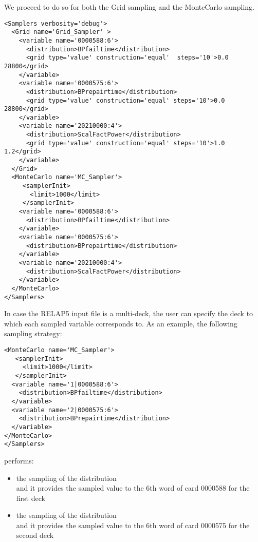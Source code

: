We proceed to do so for both the Grid sampling and the MonteCarlo sampling.

\begin{lstlisting}[style=XML,morekeywords={name,type,construction,lowerBound,steps,limit,initialSeed}]
<Samplers verbosity='debug'>
  <Grid name='Grid_Sampler' >
    <variable name='0000588:6'>
      <distribution>BPfailtime</distribution>
      <grid type='value' construction='equal'  steps='10'>0.0 28800</grid>
    </variable>
    <variable name='0000575:6'>
      <distribution>BPrepairtime</distribution>
      <grid type='value' construction='equal' steps='10'>0.0 28800</grid>
    </variable>
    <variable name='20210000:4'>
      <distribution>ScalFactPower</distribution>
      <grid type='value' construction='equal' steps='10'>1.0 1.2</grid>
    </variable>
  </Grid>
  <MonteCarlo name='MC_Sampler'>
     <samplerInit>
       <limit>1000</limit>
     </samplerInit>
    <variable name='0000588:6'>
      <distribution>BPfailtime</distribution>
    </variable>
    <variable name='0000575:6'>
      <distribution>BPrepairtime</distribution>
    </variable>
    <variable name='20210000:4'>
      <distribution>ScalFactPower</distribution>
    </variable>
  </MonteCarlo>
</Samplers>
\end{lstlisting}

In case the RELAP5 input file is a multi-deck, the user can specify the deck to which each sampled variable
corresponds to. As an example, the following sampling strategy:

\begin{lstlisting}[style=XML,morekeywords={name,type,construction,lowerBound,steps,limit,initialSeed}]
<MonteCarlo name='MC_Sampler'>
   <samplerInit>
     <limit>1000</limit>
   </samplerInit>
  <variable name='1|0000588:6'>
    <distribution>BPfailtime</distribution>
  </variable>
  <variable name='2|0000575:6'>
    <distribution>BPrepairtime</distribution>
  </variable>
</MonteCarlo>
</Samplers>
\end{lstlisting}
performs:
\begin{itemize}
  \item the sampling of the distribution \\ and it provides the sampled value
        to the 6th word of card 0000588 for the first deck
  \item the sampling of the distribution \\ and it provides the sampled value
        to the 6th word of card 0000575 for the second deck
\end{itemize}

